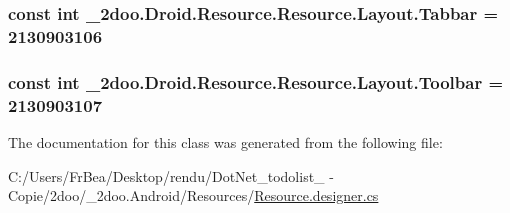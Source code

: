 \hypertarget{class__2doo_1_1_droid_1_1_resource_1_1_layout_1be33252c37a056f72bcadd5f1ac93b0}{
\subsubsection[{Tabbar}]{\setlength{\rightskip}{0pt plus 5cm}const int \_\-2doo.Droid.Resource.Resource.Layout.Tabbar = 2130903106}}
\label{class__2doo_1_1_droid_1_1_resource_1_1_layout_1be33252c37a056f72bcadd5f1ac93b0}


\hypertarget{class__2doo_1_1_droid_1_1_resource_1_1_layout_1c65e79d914035124f83486c77e12e1f}{
\subsubsection[{Toolbar}]{\setlength{\rightskip}{0pt plus 5cm}const int \_\-2doo.Droid.Resource.Resource.Layout.Toolbar = 2130903107}}
\label{class__2doo_1_1_droid_1_1_resource_1_1_layout_1c65e79d914035124f83486c77e12e1f}




The documentation for this class was generated from the following file:\begin{CompactItemize}
\item 
C:/Users/FrBea/Desktop/rendu/DotNet\_\-todolist\_ - Copie/2doo/\_\-2doo.Android/Resources/\hyperlink{_resource_8designer_8cs}{Resource.designer.cs}\end{CompactItemize}

